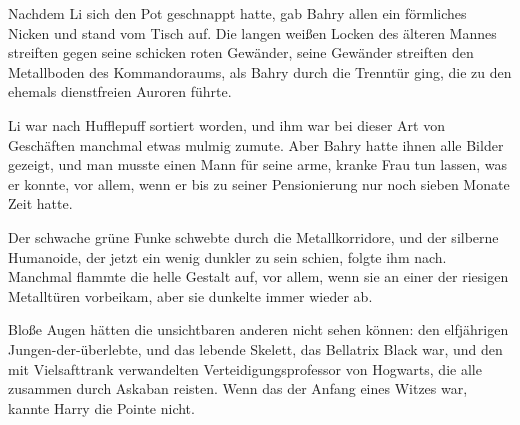 Nachdem Li sich den Pot geschnappt hatte, gab Bahry allen ein förmliches Nicken und stand vom Tisch auf. Die langen weißen Locken des älteren Mannes streiften gegen seine schicken roten Gewänder, seine Gewänder streiften den Metallboden des Kommandoraums, als Bahry durch die Trenntür ging, die zu den ehemals dienstfreien Auroren führte.

Li war nach Hufflepuff sortiert worden, und ihm war bei dieser Art von Geschäften manchmal etwas mulmig zumute. Aber Bahry hatte ihnen alle Bilder gezeigt, und man musste einen Mann für seine arme, kranke Frau tun lassen, was er konnte, vor allem, wenn er bis zu seiner Pensionierung nur noch sieben Monate Zeit hatte.

\later

Der schwache grüne Funke schwebte durch die Metallkorridore, und der silberne Humanoide, der jetzt ein wenig dunkler zu sein schien, folgte ihm nach. Manchmal flammte die helle Gestalt auf, vor allem, wenn sie an einer der riesigen Metalltüren vorbeikam, aber sie dunkelte immer wieder ab.

Bloße Augen hätten die unsichtbaren anderen nicht sehen können: den elfjährigen Jungen-der-überlebte, und das lebende Skelett, das Bellatrix Black war, und den mit Vielsafttrank verwandelten Verteidigungsprofessor von Hogwarts, die alle zusammen durch Askaban reisten. Wenn das der Anfang eines Witzes war, kannte Harry die Pointe nicht.

